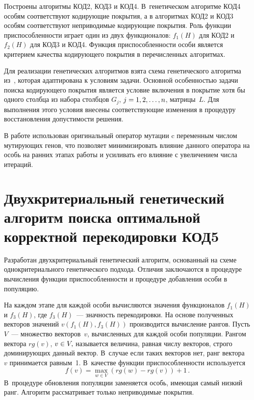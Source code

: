 \begin{multicols}{2}
Построены алгоритмы КОД2, КОД3 и КОД4. В~генетическом алгоритме КОД4
особям соответствуют кодирующие покрытия, а в алгоритмах КОД2 и КОД3
особям соответствуют неприводимые кодирующие покрытия. Роль функции
приспособленности играет один из двух функционалов: $f_1(H)$ для
КОД2 и $f_2(H)$ для КОД3 и КОД4. Функция приспособленности особи
является критерием качества кодирующего покрытия в перечисленных
алгоритмах.

Для реализации генетических алгоритмов взята схема генетического
алгоритма из~\cite{a5}, которая адаптирована к условиям задачи.
Основной особенностью задачи поиска кодирующего покрытия является
условие включения в покрытие хотя бы одного столбца из набора
столбцов $G_j$, $j\hm=1,2,\ldots ,n$, матрицы~$L$. Для выполнения этого
условия внесены соответствующие изменения в процедуру восстановления
допустимости решения.

В работе использован оригинальный оператор мутации c переменным
числом мутирующих генов, что позволяет минимизировать влияние
данного оператора на особь на ранних этапах работы и усиливать его
влияние с увеличением числа итераций.

\vspace*{-6pt}

\section{Двухкритериальный генетический алгоритм 
поиска оптимальной корректной перекодировки КОД5}

\vspace*{-1pt}

Разработан двухкритериальный генетический алгоритм, основанный на
схеме однокритериального генетического подхода. Отличия заключаются
в процедуре вычисления функции приспособленности и процедуре
добавления особи в популяцию.

На каждом этапе для каждой особи вычисляются значения функционалов
$f_1(H)$ и $f_3(H)$, где $f_3(H)$~--- значность перекодировки. На
основе полученных векторов значений $v(f_1(H), f_3(H))$ производится
вычисление рангов. Пусть $V$~--- множество векторов~$v$, вычисленных
для каждой особи популяции. Рангом вектора $rg(v)$, $v\hm\in V,$
называется величина, равная числу векторов, строго доминирующих
данный вектор. В~случае если таких векторов нет, ранг вектора~$v$
принимается равным~1. В~качестве функции приспособленности
используется 
$$
f(v)=\max\limits_{w\in V}(rg(w)-rg(v))+1\,.
$$
В~процедуре
обновления популяции заменяется особь, име\-ющая самый низкий ранг.
Алгоритм рассматривает только неприводимые покрытия.


\end{multicols}
